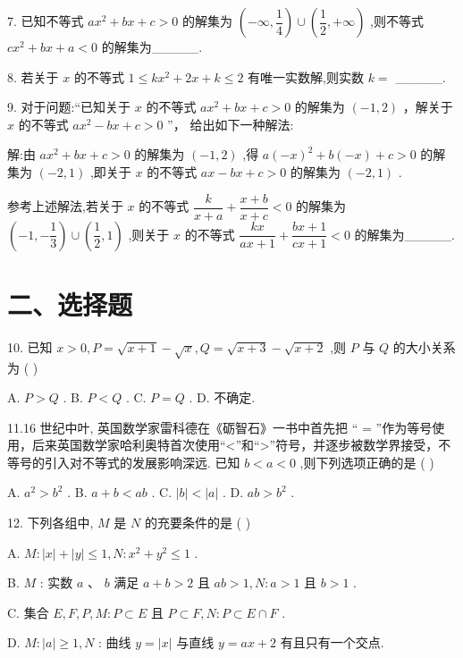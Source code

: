 7. 已知不等式 $a{x}^{2} + {bx} + c > 0$ 的解集为 $\left( {-\infty ,\dfrac{1}{4}}\right)  \cup  \left( {\dfrac{1}{2}, + \infty }\right)$ ,则不等式 $c{x}^{2} + {bx} + a < 0$ 的解集为\_\_\_\_\_.

8. 若关于 $x$ 的不等式 $1 \leq  k{x}^{2} + {2x} + k \leq  2$ 有唯一实数解,则实数 $k =$ \_\_\_\_\_.

9. 对于问题:“已知关于 $x$ 的不等式 $a{x}^{2} + {bx} + c > 0$ 的解集为 $\left( {-1,2}\right)$ ，解关于 $x$ 的不等式 $a{x}^{2} - {bx} + c > 0$ ”， 给出如下一种解法:

解:由 $a{x}^{2} + {bx} + c > 0$ 的解集为 $\left( {-1,2}\right)$ ,得 $a{\left( -x\right) }^{2} + b\left( {-x}\right)  + c > 0$ 的解集为 $\left( {-2,1}\right)$ ,即关于 $x$ 的不等式 ${ax} - {bx} + c > 0$ 的解集为 $\left( {-2,1}\right)$ .

参考上述解法,若关于 $x$ 的不等式 $\dfrac{k}{x + a} + \dfrac{x + b}{x + c} < 0$ 的解集为 $\left( {-1, - \dfrac{1}{3}}\right)  \cup  \left( {\dfrac{1}{2},1}\right)$ ,则关于 $x$ 的不等式 $\dfrac{kx}{{ax} + 1} + \dfrac{{bx} + 1}{{cx} + 1} < 0$ 的解集为\_\_\_\_\_.

\section*{二、选择题}

10. 已知 $x > 0,P = \sqrt{x + 1} - \sqrt{x},Q = \sqrt{x + 3} - \sqrt{x + 2}$ ,则 $P$ 与 $Q$ 的大小关系为 ( )

A. $P > Q$ . B. $P < Q$ . C. $P = Q$ . D. 不确定.

11.16 世纪中叶, 英国数学家雷科德在《砺智石》一书中首先把 “ = ”作为等号使用，后来英国数学家哈利奥特首次使用“<”和“>”符号，并逐步被数学界接受，不等号的引入对不等式的发展影响深远. 已知 $b < a < 0$ ,则下列选项正确的是 ( )

A. ${a}^{2} > {b}^{2}$ . B. $a + b < {ab}$ . C. $\left| b\right|  < \left| a\right|$ . D. ${ab} > {b}^{2}$ .

12. 下列各组中, $M$ 是 $N$ 的充要条件的是 ( )

A. $M : \left| x\right|  + \left| y\right|  \leq  1,N : {x}^{2} + {y}^{2} \leq  1$ .

B. $M$ : 实数 $a$ 、 $b$ 满足 $a + b > 2$ 且 ${ab} > 1,N : a > 1$ 且 $b > 1$ .

C. 集合 $E,F,P,M : P \subset  E$ 且 $P \subset  F,N : P \subset  E \cap  F$ .

D. $M : \left| a\right|  \geq  1,N$ : 曲线 $y = \left| x\right|$ 与直线 $y = {ax} + 2$ 有且只有一个交点.

